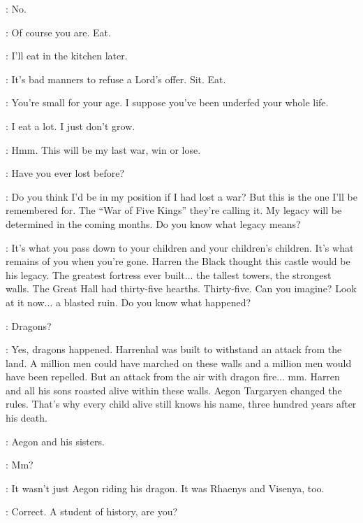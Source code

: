 \ARYA: No.

\TYWIN: Of course you are. Eat.

\ARYA: I'll eat in the kitchen later.

\TYWIN: It's bad manners to refuse a Lord's offer. Sit. Eat.


\TYWIN: You're small for your age. I suppose you've been underfed your whole life.

\ARYA: I eat a lot. I just don't grow.

\TYWIN: Hmm. This will be my last war, win or lose.


\ARYA: Have you ever lost before?

\TYWIN: Do you think I'd be in my position if I had lost a war? But this is the one I'll be remembered for. The ``War of Five Kings'' they're calling it. My legacy will be determined in the coming months. Do you know what legacy means?


\TYWIN: It's what you pass down to your children and your children's children. It's what remains of you when you're gone. Harren the Black thought this castle would be his legacy. The greatest fortress ever built$\ldots$ the tallest towers, the strongest walls. The Great Hall had thirty-five hearths. Thirty-five. Can you imagine? Look at it now$\ldots$ a blasted ruin. Do you know what happened?

\ARYA: Dragons?

\TYWIN: Yes, dragons happened. Harrenhal was built to withstand an attack from the land. A million men could have marched on these walls and a million men would have been repelled. But an attack from the air with dragon fire$\ldots$ mm. Harren and all his sons roasted alive within these walls. Aegon Targaryen changed the rules. That's why every child alive still knows his name, three hundred years after his death.

\ARYA: Aegon and his sisters.

\TYWIN: Mm?

\ARYA: It wasn't just Aegon riding his dragon. It was Rhaenys and Visenya, too.

\TYWIN: Correct. A student of history, are you?


